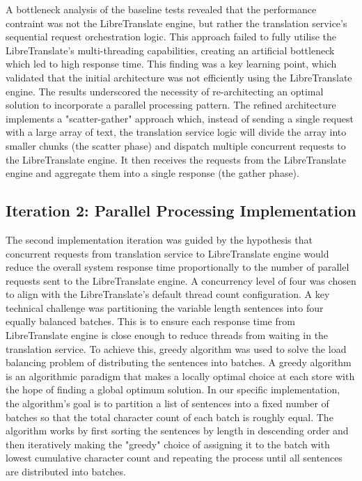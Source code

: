A bottleneck analysis of the baseline tests revealed that the performance contraint was not the LibreTranslate engine, but rather the translation service's sequential request orchestration logic. This approach failed to fully utilise the LibreTranslate's multi-threading capabilities, creating an artificial bottleneck which led to high response time. This finding was a key learning point, which validated that the initial architecture was not efficiently using the LibreTranslate engine. The results underscored the necessity of re-architecting an optimal solution to incorporate a parallel processing pattern\cite{kleppmann2017designing}. The refined architecture implements a "scatter-gather" approach which, instead of sending a single request with a large array of text, the translation service logic will divide the array into smaller chunks (the scatter phase) and dispatch multiple concurrent requests to the LibreTranslate engine. It then receives the requests from the LibreTranslate engine and aggregate them into a single response (the gather phase).

\subsection{Iteration 2: Parallel Processing Implementation}

The second implementation iteration was guided by the hypothesis that concurrent requests from translation service to LibreTranslate engine would reduce the overall system response time proportionally to the number of parallel requests sent to the LibreTranslate engine. A concurrency level of four was chosen to align with the LibreTranslate's default thread count configuration\cite{libretranslate_docs_installation}. A key technical challenge was partitioning the variable length sentences into four equally balanced batches. This is to ensure each response time from LibreTranslate engine is close enough to reduce threads from waiting in the translation service. To achieve this, greedy algorithm was used to solve the load balancing problem of distributing the sentences into batches. A greedy algorithm is an algorithmic paradigm that makes a locally optimal choice at each store with the hope of finding a global optimum solution\cite{geeksforgeeks_greedy}\cite{kleinberg2006algorithm}\cite{wiki:greedy_partitioning}. In our specific implementation, the algorithm's goal is to partition a list of sentences into a fixed number of batches so that the total character count of each batch is roughly equal. The 
algorithm works by first sorting the sentences by length in descending order and then iteratively making the "greedy" choice of assigning it to the batch with lowest cumulative character count and repeating the process until all sentences are distributed into batches.

